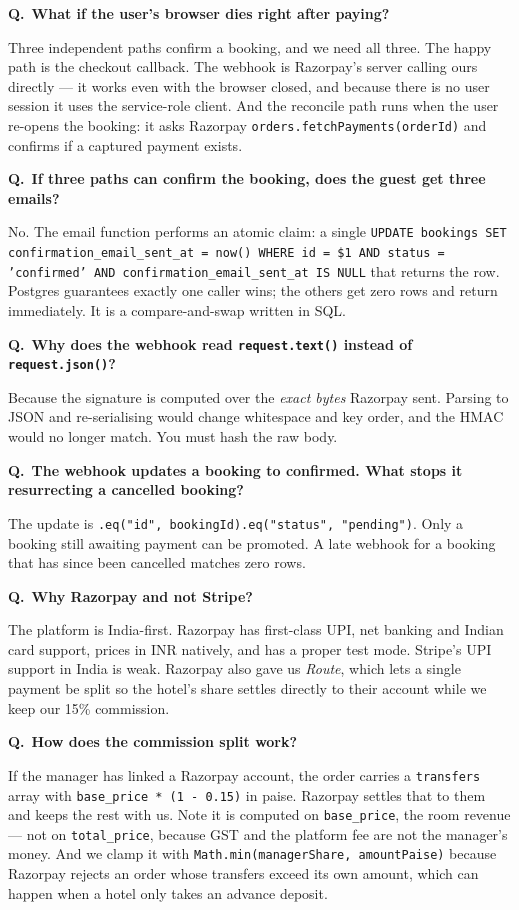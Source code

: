 \documentclass[11pt,a4paper]{article}
\newcommand{\Q}[1]{\vspace{7pt}\noindent\textbf{\color{primary}Q.}~\textbf{#1}\par\vspace{1pt}}
\newcommand{\A}[1]{\noindent #1\par}
\begin{document}
\Q{What if the user's browser dies right after paying?}
\A{Three independent paths confirm a booking, and we need all three. The happy
path is the checkout callback. The webhook is Razorpay's server calling ours
directly --- it works even with the browser closed, and because there is no user
session it uses the service-role client. And the reconcile path runs when the user
re-opens the booking: it asks Razorpay \texttt{orders.fetchPayments(orderId)} and
confirms if a captured payment exists.}

\Q{If three paths can confirm the booking, does the guest get three emails?}
\A{No. The email function performs an atomic claim: a single
\texttt{UPDATE bookings SET confirmation\_email\_sent\_at = now() WHERE id = \$1
AND status = 'confirmed' AND confirmation\_email\_sent\_at IS NULL} that returns
the row. Postgres guarantees exactly one caller wins; the others get zero rows and
return immediately. It is a compare-and-swap written in SQL.}

\Q{Why does the webhook read \texttt{request.text()} instead of
\texttt{request.json()}?}
\A{Because the signature is computed over the \emph{exact bytes} Razorpay sent.
Parsing to JSON and re-serialising would change whitespace and key order, and the
HMAC would no longer match. You must hash the raw body.}

\Q{The webhook updates a booking to confirmed. What stops it resurrecting a
cancelled booking?}
\A{The update is
\texttt{.eq("id", bookingId).eq("status", "pending")}. Only a booking still awaiting
payment can be promoted. A late webhook for a booking that has since been cancelled
matches zero rows.}

\Q{Why Razorpay and not Stripe?}
\A{The platform is India-first. Razorpay has first-class UPI, net banking and
Indian card support, prices in INR natively, and has a proper test mode. Stripe's
UPI support in India is weak. Razorpay also gave us \emph{Route}, which lets a
single payment be split so the hotel's share settles directly to their account
while we keep our 15\% commission.}

\Q{How does the commission split work?}
\A{If the manager has linked a Razorpay account, the order carries a
\texttt{transfers} array with \texttt{base\_price * (1 - 0.15)} in paise. Razorpay
settles that to them and keeps the rest with us. Note it is computed on
\texttt{base\_price}, the room revenue --- not on \texttt{total\_price}, because GST
and the platform fee are not the manager's money. And we clamp it with
\texttt{Math.min(managerShare, amountPaise)} because Razorpay rejects an order
whose transfers exceed its own amount, which can happen when a hotel only takes an
advance deposit.}
\end{document}
